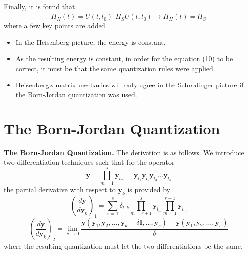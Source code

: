 \documentclass[a4paper]{article}
\theoremstyle{definition}
\begin{document}
		Finally, it is found that
		\begin{equation}
			H_H(t)=U(t,t_0)^\dagger H_S U(t,t_0)\longrightarrow H_H(t)=H_S
		\end{equation}
		where a few key points are added
		\begin{itemize}
			\item In the Heisenberg picture, the energy is constant.
			\item As the resulting energy is constant, in order for the equation (10) to be correct, it must be that the same quantization rules were applied.
			\item Heisenberg's matrix mechanics will only agree in the Schrodinger picture if the Born-Jordan quantization was used.
		\end{itemize}

\section{The Born-Jordan Quantization}
		\textbf{The Born-Jordan Quantization.} The derivation is as follows. We introduce two differentiation techniques \cite{Born1926} such that for the operator
		\begin{equation}
			\textbf{y}=\prod_{m=1}^s\textbf{y}_{l_m}=\textbf{y}_{l_1}\textbf{y}_{l_2}\textbf{y}_{l_3}\ldots\textbf{y}_{l_s}
		\end{equation}
		the partial derivative with respect to $\textbf{y}_k$ is provided by
		\begin{equation}
			\left(\frac{d\textbf{y}}{d\textbf{y}_k}\right)_1=\sum_{r=1}^{s}\delta_{l,k}\prod_{m=r+1}^{s}\textbf{y}_{l_m}\prod_{m=1}^{r-1}\textbf{y}_{l_m}
		\end{equation}
		\begin{equation}
			\left(\frac{d\textbf{y}}{d\textbf{y}_k}\right)_2=\lim_{\delta\to0}\frac{\textbf{y}(\textbf{y}_1,\textbf{y}_2,\ldots,\textbf{y}_k+\delta\textbf{I},\ldots,\textbf{y}_s)-\textbf{y}(\textbf{y}_1,\textbf{y}_2,\ldots,\textbf{y}_s)}{\delta}
		\end{equation}
		where the resulting quantization must let the two differentiations be the same. 
		
\end{document}

